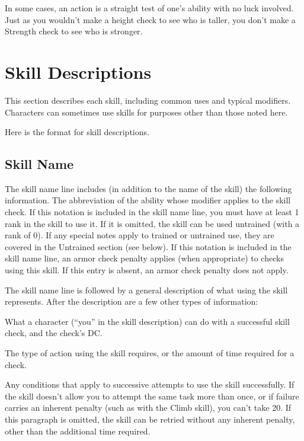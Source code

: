 In some cases, an action is a straight test of one's ability with no luck involved. Just as you wouldn't make a height check to see who is taller, you don't make a Strength check to see who is stronger.

\section{Skill Descriptions}
This section describes each skill, including common uses and typical modifiers. Characters can sometimes use skills for purposes other than those noted here.

Here is the format for skill descriptions.

\subsection*{Skill Name}
The skill name line includes (in addition to the name of the skill) the following information.
 The abbreviation of the ability whose modifier applies to the skill check.
 If this notation is included in the skill name line, you must have at least 1 rank in the skill to use it. If it is omitted, the skill can be used untrained (with a rank of 0). If any special notes apply to trained or untrained use, they are covered in the Untrained section (see below).
 If this notation is included in the skill name line, an armor check penalty applies (when appropriate) to checks using this skill. If this entry is absent, an armor check penalty does not apply.

\par The skill name line is followed by a general description of what using the skill represents. After the description are a few other types of information:

 What a character (``you'' in the skill description) can do with a successful skill check, and the check's DC.

 The type of action using the skill requires, or the amount of time required for a check.

 Any conditions that apply to successive attempts to use the skill successfully. If the skill doesn't allow you to attempt the same task more than once, or if failure carries an inherent penalty (such as with the Climb skill), you can't take 20. If this paragraph is omitted, the skill can be retried without any inherent penalty, other than the additional time required.

